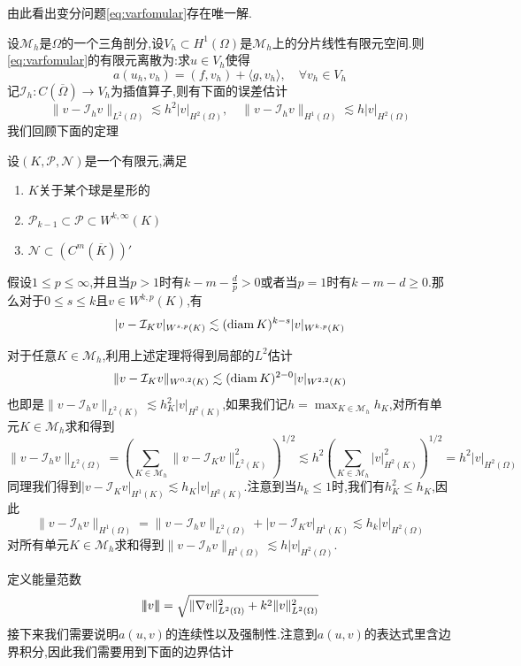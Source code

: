 由此看出变分问题\eqref{eq:varfomular}存在唯一解.\par
设$\mathcal{M}_h$是$\Omega$的一个三角剖分,设$V_h\subset H^1(\Omega)$是$\mathcal{M}_h$上的分片线性有限元空间.则\eqref{eq:varfomular}的有限元离散为:求$u\in V_h$使得
\begin{equation}\label{eq:varfomular_discrete}
    a(u_h,v_h)=(f,v_h)+\langle g,v_h\rangle,\quad \forall v_h\in V_h
\end{equation}
记$\mathcal{I}_h:C(\overline{\Omega})\to V_h$为插值算子,则有下面的误差估计
$$
\|v-\mathcal{I}_hv\|_{L^2(\Omega)}\lesssim h^2|v|_{H^2(\Omega)},\quad \|v-\mathcal{I}_h v\|_{H^1(\Omega)}\lesssim h|v|_{H^2(\Omega)}
$$
\qquad 我们回顾下面的定理
\begin{Theorem}
    设$(K,\mathcal{P},\mathcal{N})$是一个有限元,满足
    \begin{enumerate}
        \item $K$关于某个球是星形的
        \item $\mathcal{P}_{k-1}\subset \mathcal{P}\subset W^{k,\infty}(K)$
        \item $\mathcal{N}\subset (C^m(\overline{K}))'$
    \end{enumerate}
    假设$1\leqslant p\leqslant \infty$,并且当$p>1$时有$k-m-\frac{d}{p}>0$或者当$p=1$时有$k-m-d\geqslant 0$.那么对于$0\leqslant s\leqslant k$且$v\in W^{k,p}(K)$,有
    $$
    |v-\mathcal{I}_K v|_{W^{s,p}(K)}\lesssim (\operatorname{diam} K)^{k-s}|v|_{W^{k,p}(K)}
    $$
\end{Theorem}
对于任意$K\in\mathcal{M}_h$,利用上述定理将得到局部的$L^2$估计
$$
\|v-\mathcal{I}_K v\|_{W^{0,2}(K)}\lesssim (\operatorname{diam} K)^{2-0}|v|_{W^{2,2}(K)}
$$
也即是$\|v-\mathcal{I}_hv\|_{L^2(K)}\lesssim h_K^2|v|_{H^2(K)}$,如果我们记$h=\max_{K\in\mathcal{M}_h} h_K$,对所有单元$K\in\mathcal{M}_h$求和得到
$$
\|v-\mathcal{I}_hv\|_{L^2(\Omega)}=\left(\sum_{K\in\mathcal{M}_h}\|v-\mathcal{I}_K v\|_{L^2(K)}^2\right)^{1/2}\lesssim h^2\left(\sum_{K\in\mathcal{M}_h}|v|_{H^2(K)}^2\right)^{1/2}=h^2|v|_{H^2(\Omega)}
$$
同理我们得到$|v-\mathcal{I}_K v|_{H^1(K)}\lesssim h_K|v|_{H^2(K)}$.注意到当$h_k\leqslant 1$时,我们有$h_K^2\leqslant h_K$,因此
$$
\|v-\mathcal{I}_hv\|_{H^1(\Omega)}=\|v-\mathcal{I}_hv\|_{L^2(\Omega)}+|v-\mathcal{I}_K v|_{H^1(K)}\lesssim h_k|v|_{H^2(\Omega)}
$$
对所有单元$K\in\mathcal{M}_h$求和得到$\|v-\mathcal{I}_h v\|_{H^1(\Omega)}\lesssim h|v|_{H^2(\Omega)}$.\par
定义能量范数
$$
|\!|\!| v |\!|\!|=\sqrt{\|\nabla v\|^2_{L^2(\Omega)}+k^2\|v\|^2_{L^2(\Omega)}}
$$
接下来我们需要说明$a(u,v)$的连续性以及强制性.注意到$a(u,v)$的表达式里含边界积分,因此我们需要用到下面的边界估计
